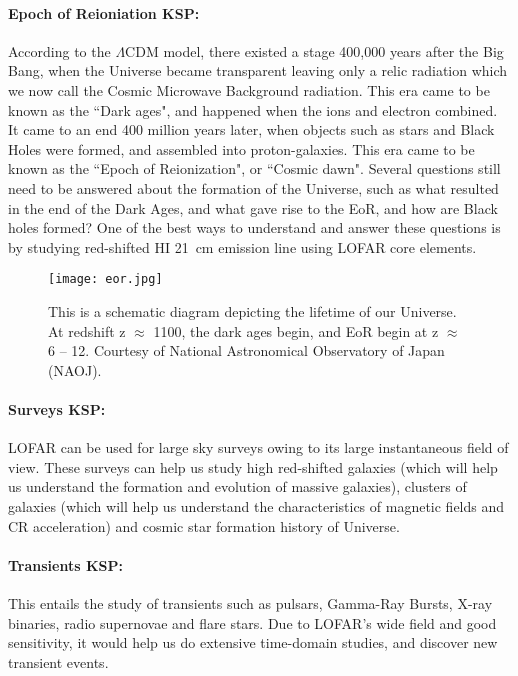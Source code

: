 \documentclass[../main/thesis_msc.tex]{subfiles}
\begin{document}
\paragraph{Epoch of Reioniation KSP:} According to the $\Lambda$CDM model, there existed a stage 400,000 years after the Big Bang, when the Universe became transparent leaving only a relic radiation which we now call the Cosmic Microwave Background radiation. This era came to be known as the ``Dark ages", and happened when the ions and electron combined. It came to an end 400 million years later, when objects such as stars and Black Holes were formed, and assembled into proton-galaxies. This era came to be known as the ``Epoch of Reionization", or ``Cosmic dawn". Several questions still need to be answered about the formation of the Universe, such as what resulted in the end of the Dark Ages, and what gave rise to the EoR, and how are Black holes formed? One of the best ways to understand and answer these questions is by studying red-shifted HI 21~cm emission line using LOFAR core elements.
\begin{figure}
\centering
\texttt{[image: eor.jpg]}
\caption{This is a schematic diagram depicting the lifetime of our Universe. At redshift z $\approx$ 1100, the dark ages begin, and EoR begin at z $\approx$ 6 -- 12. Courtesy of National Astronomical Observatory of Japan (NAOJ).}
\end{figure}
\paragraph{Surveys KSP:} LOFAR can be used for large sky surveys owing to its large instantaneous field of view. These surveys can help us study high red-shifted galaxies (which will help us understand the formation and evolution of massive galaxies), clusters of galaxies (which will help us understand the characteristics of magnetic fields and CR acceleration) and cosmic star formation history of Universe.
\paragraph{Transients KSP:} This entails the study of transients such as pulsars, Gamma-Ray Bursts, X-ray binaries, radio supernovae and flare stars. Due to LOFAR's wide field and good sensitivity, it would help us do extensive time-domain studies, and discover new transient events.
\end{document}
